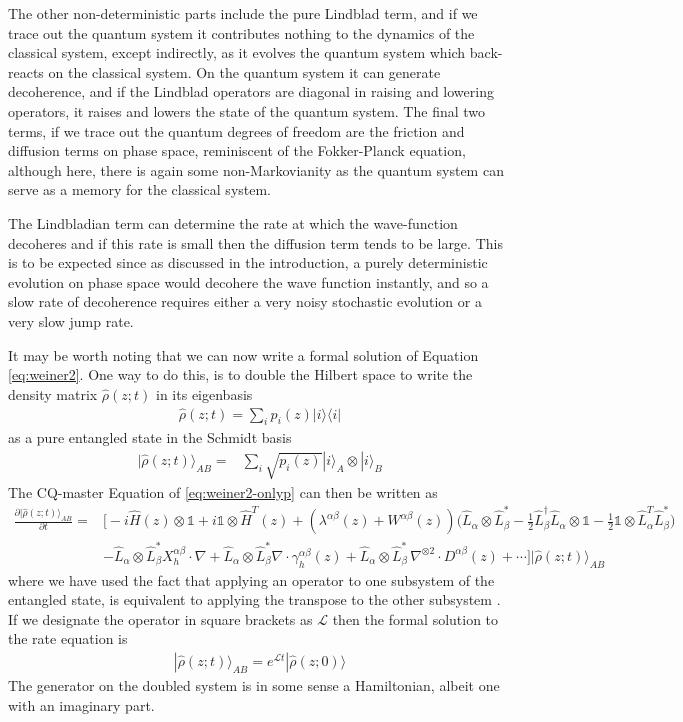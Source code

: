 \documentclass[aps,pra,showpacs,citeautoscript,amsmath,amssymb,floatfix,superscriptaddress,bbm, verbatim,amsfonts,changes,11pt,nofootinbib,longbibliography]{revtex4-2}
\newcommand{\id}{\mathbb{1}}
\newcommand{\ket}[1]{|#1\rangle}
\newcommand{\proj}[1]{|#1\rangle\!\langle#1|}
\newcommand{\foothide}[1]{\ignorespaces} %
\def\z{{z}}
\def\L{{\hat{L}}}
\def\Hq{\hat{H}}
\def\rate{{W}}
\def\linrate{{\lambda}}
\def\ab{^{\alpha\beta}}
\renewcommand{\varrho}{\hat{\rho}}
\def\cqstate{\varrho}
\def\psiz{{\varrho(\z;t)}}
\def\psizt{{\varrho(\z;t)}}
\def\friction{\gamma}
\begin{document}
The other non-deterministic parts include the pure Lindblad term, and if we trace out the quantum system it contributes nothing to the dynamics of the classical system, except indirectly, as it evolves the quantum system which back-reacts on the classical system.  On the quantum system it can generate decoherence, and if the Lindblad operators are diagonal in raising and lowering operators, it raises and lowers the state of the quantum system. The final two terms, if we trace out the quantum degrees of freedom are the friction and diffusion terms on phase space, reminiscent of the Fokker-Planck equation, although here, there is again some non-Markovianity as the quantum system can serve as a memory for the classical system.

The Lindbladian term can determine the rate at which the wave-function decoheres and if this rate is small then the diffusion term tends to be large. This is to be expected since as discussed in the introduction, a purely deterministic evolution on phase space would decohere the wave function instantly, and so a slow rate of decoherence requires either a very noisy stochastic evolution or a very slow jump rate.



It may be worth noting that we can now write a formal solution of Equation \eqref{eq:weiner2}. One way to do this, is to  double the Hilbert space \cite{FeynmanVernon1963,jamiolkowski1972linear,choi1975completely}\foothide{For the moment we take the quantum system to be finite dimensional, since extension to the continuous case is straightforward} to write the density matrix $\psiz$ in its eigenbasis
\begin{align}
\psiz=\sum_i p_i(\z)\proj{i}
\end{align}
as a pure entangled state in the Schmidt basis
\begin{align}
\ket{\psiz}_{AB}=&\sum_i \sqrt{p_i(\z)}\ket{i}_A\otimes\ket{i}_B
\end{align}
The CQ-master Equation of \eqref{eq:weiner2-onlyp} can then be written as
\begin{align}
\frac{\partial\ket{\psiz}_{AB}}{\partial t}
=&\Big[-i\Hq(\z)\otimes\id+i\id\otimes\Hq^T(\z)
+(\linrate\ab(\z)+\rate\ab(\z)) \big(\L_{\alpha}\otimes\L^*_{\beta}
-\frac{1}{2}\L^\dagger_\beta\L_\alpha\otimes\id
-\frac{1}{2}\id\otimes\L^T_\alpha\L^*_\beta\big)
\nonumber\\
&-
\L_{\alpha}\otimes\L^*_{\beta}X_h\ab\cdot\nabla
+
\L_{\alpha}\otimes\L^*_{\beta}\nabla \cdot\friction\ab_h(\z)
+
\L_{\alpha}\otimes\L^*_{\beta}\,\nabla^{\otimes 2}\cdot D^{\alpha\beta}(\z)
+\cdots
\Big]\ket{\psiz}_{AB}
\label{eq:doubled}
\end{align}
where we have used the fact that applying an operator to one subsystem of the entangled state, is equivalent to applying the transpose to the other subsystem \cite{jozsa1994fidelity}.
If we designate the operator in square brackets as $\bm{\mathcal{L}}$ then the formal solution to the rate equation is
\begin{align}
\ket{\psizt}_{AB}=e^{\bm{\mathcal{L}}t}\ket{\cqstate(\z;0)}
\label{eq:prop}
\end{align}
The generator on the doubled system is in some sense a Hamiltonian, albeit one with an imaginary part.
\end{document}
